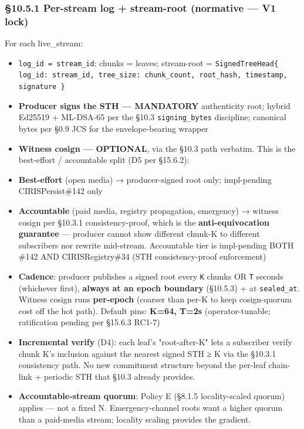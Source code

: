 \documentclass[11pt]{article}
\begin{document}
\subsubsection*{§10.5.1 Per-stream log + stream-root (normative — V1 lock)}


For each live\_stream:


\begin{itemize}\setlength\itemsep{0pt}
\item \texttt{log\_id = stream\_id}; chunks = leaves; stream-root = \texttt{SignedTreeHead\{ log\_id: stream\_id, tree\_size: chunk\_count, root\_hash, timestamp, signature \}}
\item \textbf{Producer signs the STH — MANDATORY} authenticity root; hybrid Ed25519 + ML-DSA-65 per the §10.3 \texttt{signing\_bytes} discipline; canonical bytes per §0.9 JCS for the envelope-bearing wrapper
\item \textbf{Witness cosign — OPTIONAL}, via the §10.3 path verbatim. This is the best-effort / accountable split (D5 per §15.6.2):
\item \textbf{Best-effort} (open media) → producer-signed root only; impl-pending CIRISPersist\#142 only
\item \textbf{Accountable} (paid media, registry propagation, emergency) → witness cosign per §10.3.1 consistency-proof, which is the \textbf{anti-equivocation guarantee} — producer cannot show different chunk-K to different subscribers nor rewrite mid-stream. Accountable tier is impl-pending BOTH \#142 AND CIRISRegistry\#34 (STH consistency-proof enforcement)
\item \textbf{Cadence}: producer publishes a signed root every \texttt{K} chunks OR \texttt{T} seconds (whichever first), \textbf{always at an epoch boundary} (§10.5.3) + at \texttt{sealed\_at}. Witness cosign runs \textbf{per-epoch} (coarser than per-K to keep cosign-quorum cost off the hot path). Default pins: \textbf{K=64, T=2s} (operator-tunable; ratification pending per §15.6.3 RC1-7)
\item \textbf{Incremental verify} (D4): each leaf's "root-after-K" lets a subscriber verify chunk K's inclusion against the nearest signed STH ≥ K via the §10.3.1 consistency path. No new commitment structure beyond the per-leaf chain-link + periodic STH that §10.3 already provides.
\item \textbf{Accountable-stream quorum}: Policy E (§8.1.5 locality-scaled quorum) applies — not a fixed N. Emergency-channel roots want a higher quorum than a paid-media stream; locality scaling provides the gradient.
\end{itemize}
\end{document}
